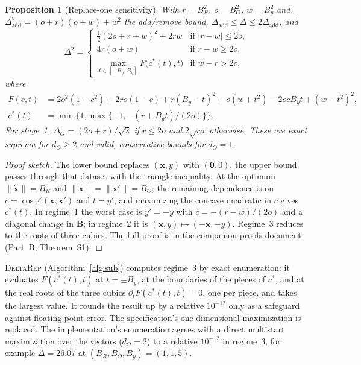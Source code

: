 \documentclass[11pt]{article}
\theoremstyle{definition}
\theoremstyle{plain}
\newtheorem{proposition}{Proposition}[section]
\newcommand{\bx}{\mathbf{x}}
\newcommand{\bxd}{\dot{\mathbf{x}}}
\newcommand{\bB}{\mathbf{B}}
\begin{document}
\begin{proposition}[Replace-one sensitivity]
\label{prop:sens}
With $r = B_R^2$, $o = B_O^2$, $w = B_y^2$ and $\Delta_{\mathrm{add}}^2 = (o + r)(o + w) + w^2$ the add/remove bound, $\Delta_{\mathrm{add}} \le \Delta \le 2\Delta_{\mathrm{add}}$, and
\begin{equation}
  \Delta^{2} =
  \begin{cases}
    \tfrac12(2o + r + w)^{2} + 2rw & \text{if } |r - w| \le 2o,\\[2pt]
    4r(o + w) & \text{if } r - w \ge 2o,\\[2pt]
    \max_{t \in [-B_{y}, B_{y}]} F\bigl(c^{\ast}(t), t\bigr) & \text{if } w - r > 2o,
  \end{cases}
  \label{eq:sens_closed}
\end{equation}
where
\begin{align*}
  F(c,t) &= 2o^{2}(1 - c^{2}) + 2ro(1 - c) + r(B_{y} - t)^{2} + o(w + t^{2}) - 2ocB_{y}t + (w - t^{2})^{2},\\
  c^{\ast}(t) &= \min\bigl\{1, \max\{-1, -(r + B_{y}t)/(2o)\}\bigr\}.
\end{align*}
For stage~1, $\Delta_G = (2o + r)/\sqrt2$ if $r \le 2o$ and $2\sqrt{ro}$ otherwise. These are exact suprema for $d_O \ge 2$ and valid, conservative bounds for $d_O = 1$.
\end{proposition}

\begin{proof}[Proof sketch]
The lower bound replaces $(\bx, y)$ with $(\mathbf 0, 0)$, the upper bound passes through that dataset with the triangle inequality. At the optimum $\|\bxd\| = B_R$ and $\|\bx\| = \|\bx'\| = B_O$; the remaining dependence is on $c = \cos\angle(\bx, \bx')$ and $t = y'$, and maximizing the concave quadratic in $c$ gives $c^\ast(t)$. In regime~1 the worst case is $y' = -y$ with $c = -(r - w)/(2o)$ and a diagonal change in $\bB$; in regime~2 it is $(\bx, y) \mapsto (-\bx, -y)$. Regime~3 reduces to the roots of three cubics. The full proof is in the companion proofs document (Part~B, Theorem~S1).
\end{proof}

\textsc{DeltaRep} (Algorithm~\ref{alg:sub}) computes regime~3 by exact enumeration: it evaluates $F(c^\ast(t), t)$ at $t = \pm B_y$, at the boundaries of the pieces of $c^\ast$, and at the real roots of the three cubics $\partial_t F(c^\ast(t), t) = 0$, one per piece, and takes the largest value. It rounds the result up by a relative $10^{-12}$ only as a safeguard against floating-point error. The specification's one-dimensional maximization is replaced. The implementation's enumeration agrees with a direct multistart maximization over the vectors ($d_O = 2$) to a relative $10^{-12}$ in regime~3, for example $\Delta = 26.07$ at $(B_R, B_O, B_y) = (1, 1, 5)$.
\end{document}
